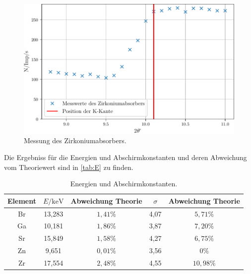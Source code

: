 \begin{figure}
  \centering
  \includegraphics{build/zirkonium.pdf}
  \caption{Messung des Zirkoniumabsorbers.}
  \label{fig:zirkonium}
\end{figure}

Die Ergebniss für die Energien und Abschirmkonstanten und deren Abweichung vom Theoriewert sind in \autoref{tab:E}
zu finden.
\begin{table}
  \caption{Energien und Abschirmkonstanten.}
  \label{tab:E}
  \begin{tabular}{c | c c c c}
    \toprule
    Element & $E/\unit{\kilo\eV}$ & Abweichung Theorie & $\sigma$ & Abweichung Theorie \\
    \midrule
    Br & 13,283 & $1,41\%$ & 4,07 & $5,71\%$ \\
    Ga & 10,181 & $1,86\%$ & 3,87 & $7,20\%$ \\
    Sr & 15,849 & $1,58\%$ & 4,27 & $6,75\%$ \\
    Zn &  9,651 & $0,01\%$ & 3,56 & $0\%$ \\
    Zr & 17,554 & $2,48\%$ & 4,55 & $10,98\%$ \\
    \bottomrule
  \end{tabular}
\end{table}

